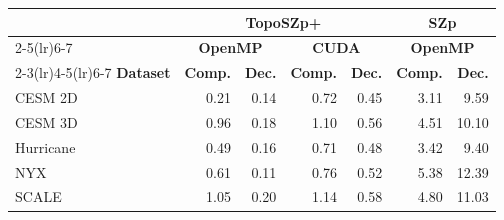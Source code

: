 \begin{tabular}{@{}lrrrrrr@{}}
\toprule
 & \multicolumn{4}{c}{\textbf{TopoSZp+}} & \multicolumn{2}{c}{\textbf{SZp}} \\
\cmidrule(lr){2-5}\cmidrule(lr){6-7}
 & \multicolumn{2}{c}{\textbf{OpenMP}} & \multicolumn{2}{c}{\textbf{CUDA}} & \multicolumn{2}{c}{\textbf{OpenMP}} \\
\cmidrule(lr){2-3}\cmidrule(lr){4-5}\cmidrule(lr){6-7}
\textbf{Dataset} & \textbf{Comp.} & \textbf{Dec.} & \textbf{Comp.} & \textbf{Dec.} & \textbf{Comp.} & \textbf{Dec.} \\
\midrule
CESM 2D & 0.21 & 0.14 & 0.72 & 0.45 & 3.11 & 9.59 \\
CESM 3D & 0.96 & 0.18 & 1.10 & 0.56 & 4.51 & 10.10 \\
Hurricane & 0.49 & 0.16 & 0.71 & 0.48 & 3.42 & 9.40 \\
NYX & 0.61 & 0.11 & 0.76 & 0.52 & 5.38 & 12.39 \\
SCALE & 1.05 & 0.20 & 1.14 & 0.58 & 4.80 & 11.03 \\
\bottomrule
\end{tabular}
